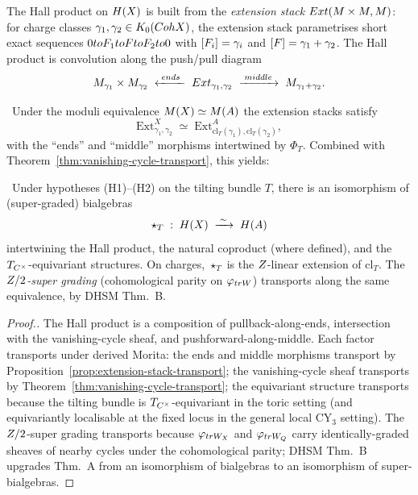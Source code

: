 The Hall product on $H(X)$ is built from the \emph{extension stack}
$Ext(M \times M, M)$: for charge classes
$\gamma_1, \gamma_2 \in K_0(Coh X)$, the extension stack parametrises short
exact sequences $0 to F_1 to F to F_2 to 0$ with
$[F_i] = \gamma_i$ and $[F] = \gamma_1 + \gamma_2$. The Hall product is
convolution along the push/pull diagram
\[
  M_{\gamma_1} \times M_{\gamma_2}
  \;\xleftarrow{\;ends\;}\;
  Ext_{\gamma_1, \gamma_2}
  \;\xrightarrow{\;middle\;}\;
  M_{\gamma_1 + \gamma_2}.
\]

\begin{proposition}
\label{prop:extension-stack-transport}
\ClaimStatusProposition\ Under the moduli equivalence
$M(X) \simeq M(A)$ the extension stacks satisfy
\[
  \mathrm{Ext}_{\gamma_1, \gamma_2}^{X} \;\simeq\;
  \mathrm{Ext}_{\mathrm{cl}_T(\gamma_1), \mathrm{cl}_T(\gamma_2)}^{A},
\]
with the ``ends'' and ``middle'' morphisms intertwined by $\Phi_T$. Combined
with Theorem~\ref{thm:vanishing-cycle-transport}, this yields:
\end{proposition}

\begin{theorem}
\label{thm:hall-product-transport}
\ClaimStatusTheorem\ Under hypotheses (H1)--(H2) on the tilting bundle $T$,
there is an isomorphism of (super-graded) bialgebras
\[
  \star_T \;:\; H(X) \;\xrightarrow{\;\sim\;}\; H(A)
\]
intertwining the Hall product, the natural coproduct (where defined), and the
$T_{C^\times}$-equivariant structures. On charges, $\star_T$ is the
$Z$-linear extension of $\mathrm{cl}_T$. The \emph{$Z/2$-super grading}
(cohomological parity on $\varphi_{tr W}$) transports along the same
equivalence, by DHSM Thm.~B.
\end{theorem}

\begin{proof}[Proof.]
The Hall product is a composition of pullback-along-ends, intersection with
the vanishing-cycle sheaf, and pushforward-along-middle. Each factor transports
under derived Morita: the ends and middle morphisms transport by
Proposition~\ref{prop:extension-stack-transport}; the vanishing-cycle sheaf
transports by Theorem~\ref{thm:vanishing-cycle-transport}; the equivariant
structure transports because the tilting bundle is $T_{C^\times}$-equivariant
in the toric setting (and equivariantly localisable at the fixed locus in the
general local CY$_3$ setting). The $Z/2$-super grading transports because
$\varphi_{tr W_X}$ and $\varphi_{tr W_Q}$ carry identically-graded sheaves of
nearby cycles under the cohomological parity; DHSM Thm.~B upgrades Thm.~A from
an isomorphism of bialgebras to an isomorphism of super-bialgebras.
\end{proof}

